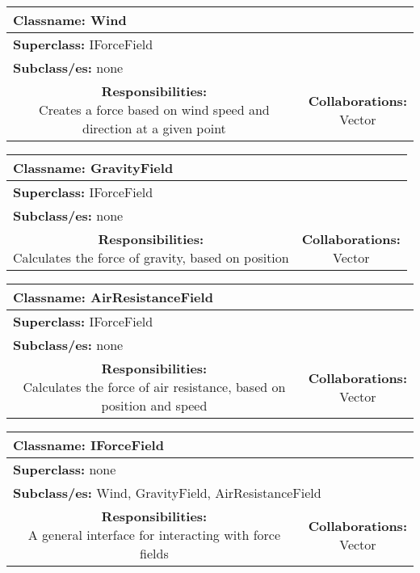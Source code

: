\documentclass{article}
\begin{document}
\begin {center}
\begin{tabular}{|c|c|}
\hline
\multicolumn{2}{|l|}{\textbf{Classname:} Wind}\\
\hline
\multicolumn{2}{|l|}{\textbf{Superclass:} IForceField}\\
\multicolumn{2}{|l|}{\textbf{Subclass/es:} none}\\
\hline
\parbox[]{5cm}{\textbf{Responsibilities:} \\Creates a force based on wind speed and direction at a given point} & \parbox[]{5cm}{\textbf{Collaborations:}\\Vector}\\
\hline
 \end{tabular}\vspace{.4cm}

\begin{tabular}{|c|c|}
\hline
\multicolumn{2}{|l|}{\textbf{Classname:} GravityField}\\
\hline
\multicolumn{2}{|l|}{\textbf{Superclass:} IForceField}\\
\multicolumn{2}{|l|}{\textbf{Subclass/es:} none}\\
\hline
\parbox[]{5cm}{\textbf{Responsibilities:} \\Calculates the force of gravity, based on position} & \parbox[]{5cm}{\textbf{Collaborations:}\\Vector}\\
\hline
 \end{tabular}\vspace{.4cm}

\begin{tabular}{|c|c|}
\hline
\multicolumn{2}{|l|}{\textbf{Classname:} AirResistanceField}\\
\hline
\multicolumn{2}{|l|}{\textbf{Superclass:} IForceField}\\
\multicolumn{2}{|l|}{\textbf{Subclass/es:} none}\\
\hline
\parbox[]{5cm}{\textbf{Responsibilities:} \\Calculates the force of air resistance, based on position and speed} & \parbox[]{5cm}{\textbf{Collaborations:}\\Vector}\\
\hline
 \end{tabular}\vspace{.4cm}

\begin{tabular}{|c|c|}
\hline
\multicolumn{2}{|l|}{\textbf{Classname:} IForceField}\\
\hline
\multicolumn{2}{|l|}{\textbf{Superclass:} none}\\
\multicolumn{2}{|l|}{\textbf{Subclass/es:} Wind, GravityField, AirResistanceField}\\
\hline
\parbox[]{5cm}{\textbf{Responsibilities:} \\A general interface for interacting with force fields} & \parbox[]{5cm}{\textbf{Collaborations:}\\Vector}\\
\hline
 \end{tabular}\vspace{.4cm}


\end{center}
\end{document}
